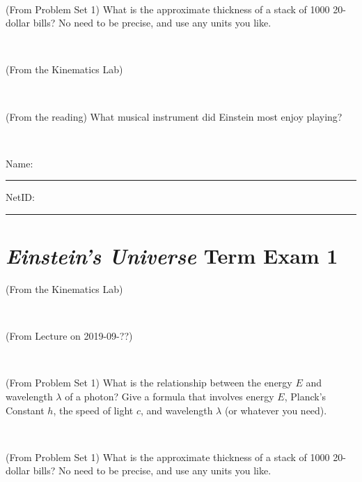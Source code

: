 \documentclass[12pt, letterpaper]{article}
\begin{document}
\vfill ~

\begin{problem} (From Problem Set 1)
What is the approximate thickness of a stack of 1000 20-dollar bills?
No need to be precise, and use any units you like.
\end{problem}


\vfill ~

\begin{problem} (From the Kinematics Lab)

\end{problem}


\vfill ~

\begin{problem} (From the reading)
What musical instrument did Einstein most enjoy playing?
\end{problem}


\vfill ~


\cleardoublepage



\noindent
Name: \rule[-1ex]{0.60\textwidth}{0.1pt}
NetID: \rule[-1ex]{0.20\textwidth}{0.1pt}

\section*{\textsl{Einstein's Universe} Term Exam 1}
\setcounter{problem}{1}


\begin{problem} (From the Kinematics Lab)

\end{problem}


\vfill ~

\begin{problem} (From Lecture on 2019-09-??)
\end{problem}


\vfill ~

\begin{problem} (From Problem Set 1)
What is the relationship between the energy $E$ and wavelength
$\lambda$ of a photon? Give a formula that involves energy $E$,
Planck's Constant $h$, the speed of light $c$, and wavelength
$\lambda$ (or whatever you need).
\end{problem}

\vfill ~

\begin{problem} (From Problem Set 1)
What is the approximate thickness of a stack of 1000 20-dollar bills?
No need to be precise, and use any units you like.
\end{problem}
\end{document}
